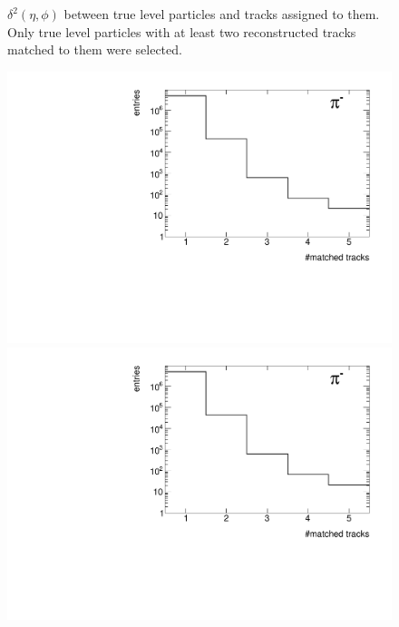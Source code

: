 \begin{figure}[h!]
{	}%
	\caption[$\delta^{2}\left(\eta,\phi\right)$ between true level particles and tracks assigned to them.]{$\delta^{2}\left(\eta,\phi\right)$ between true level particles and tracks assigned to them. Only true level particles with at least two reconstructed tracks matched to them were selected.}\label{fig:trackSplittingNominalDelta_2}
\end{figure}
\begin{figure}[ht]
	\centering
	\parbox{0.329\textwidth}{
		\centering
		\includegraphics[width=\linewidth,page=31]{graphics/eff/trackSplitting_CD.pdf}\\
		\includegraphics[width=\linewidth,page=34]{graphics/eff/trackSplitting_CD.pdf}\\
	}~
	\parbox{0.329\textwidth}{
		\centering
}
\end{figure}
